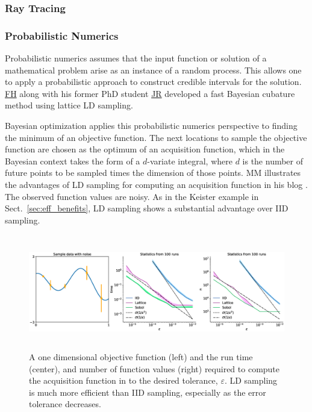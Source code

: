 \documentclass[11pt]{NSFamsart}
\newcommand{\FH}{\hyperlink{FHlink}{FH}\xspace}
\newcommand{\JR}{\hyperlink{JRlink}{JR}\xspace}
\begin{document}
\subsubsection{Ray Tracing}


\subsubsection{Probabilistic Numerics}
Probabilistic numerics assumes that the input function or solution of a mathematical problem arise as an instance of a random process.  This allows one to apply a probabilistic approach to construct credible intervals for the solution.  \FH along with his former PhD student \JR developed a fast Bayesian cubature method \cite{RatHic19a} using lattice LD sampling.

Bayesian optimization applies this probabilistic numerics perspective to finding the minimum of an objective function.  The next locations to sample the objective function are chosen as the optimum of an acquisition function, which in the Bayesian context takes the form of a $d$-variate integral, where $d$ is the number of future points to be sampled times the dimension of those points.  MM illustrates the advantages of LD sampling for computing an acquisition function in his blog \cite[qEI with QMCPy]{QMCBlog}.  The observed function values are noisy.  As in the Keister example in Sect.\ \ref{sec:eff_benefits}, LD sampling shows a substantial advantage over IID sampling.

\begin{figure}[H]
	\centering
	\includegraphics[height = 5cm]{ProgramsImages/qEI_cost_comp_time.eps}
	\caption{A one dimensional objective function (left) and the run time (center), and number of function values (right) required to compute the acquisition function in \cite[qEI with QMCPy]{QMCBlog} to the desired tolerance, $\varepsilon$.  LD sampling is much more efficient than IID sampling, especially as the error tolerance decreases.}
	\label{fig:qei}
\end{figure}
\end{document}
